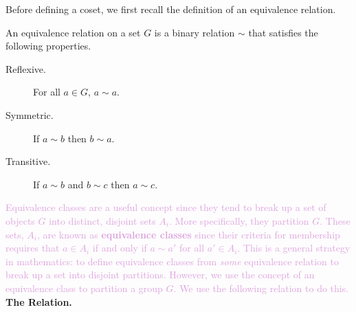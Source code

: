 \documentclass[12pt,letterpaper]{algebra_book}
\theoremstyle{definition}
\begin{document}
    Before defining a coset, we first recall the definition of an
    equivalence relation. 

    \begin{definition}
        An equivalence relation on a set $G$ is a binary relation
        $\sim$ that satisfies the following properties.
        \begin{description}
            \item[Reflexive.] For all $a \in G$, $a \sim a$.
            \item[Symmetric.] If $a \sim b$ then $b \sim a$.
            \item[Transitive.] If $a \sim b$ and $b \sim c$ then $a
            \sim c$. 
        \end{description}
    \end{definition}

    \textcolor{Plum}{Equivalence classes are a useful concept since they tend to break
    up a set of objects $G$ into distinct, disjoint sets $A_i$. More
    specifically, they partition $G$. These sets, $A_i$, are
    known as \textbf{equivalence classes} since their criteria for
    membership requires that $a \in A_i$ if and only if $a \sim a'$ for
    all $a' \in A_i$. 
    This is a general strategy in mathematics: to define equivalence
    classes from \textit{some} equivalence relation to break up a set
    into disjoint partitions. However, we use the
    concept of an equivalence class to partition a group $G$. We use
    the following relation to do this.}
    \\

    \textcolor{blue!90!black!100}{\textbf{The Relation.}}
\end{document}
